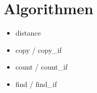 \section{Algorithmen}
\begin{itemize}
\item distance
\item copy / copy\_if
\item count / count\_if
\item find / find\_if
\end{itemize}
